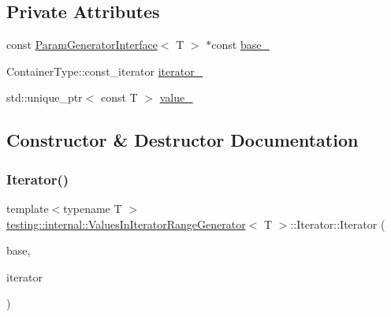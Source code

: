 \subsection*{Private Attributes}
\begin{DoxyCompactItemize}
\item 
const \hyperlink{classtesting_1_1internal_1_1ParamGeneratorInterface}{Param\+Generator\+Interface}$<$ T $>$ $\ast$const \hyperlink{classtesting_1_1internal_1_1ValuesInIteratorRangeGenerator_1_1Iterator_a904df7e46beda1ce5ac2c0ecd6680e0d}{base\+\_\+}
\item 
Container\+Type\+::const\+\_\+iterator \hyperlink{classtesting_1_1internal_1_1ValuesInIteratorRangeGenerator_1_1Iterator_aaff15b9f8addac71b91c32053bf9ea1e}{iterator\+\_\+}
\item 
std\+::unique\+\_\+ptr$<$ const T $>$ \hyperlink{classtesting_1_1internal_1_1ValuesInIteratorRangeGenerator_1_1Iterator_af51f1a21ffb0cd531de7574f4ad1f9b6}{value\+\_\+}
\end{DoxyCompactItemize}


\subsection{Constructor \& Destructor Documentation}
\mbox{\label{classtesting_1_1internal_1_1ValuesInIteratorRangeGenerator_1_1Iterator_aebd635efe7082e6fc45bb8ae0dbefd2e}} 
\subsubsection{\texorpdfstring{Iterator()}{Iterator()}\hspace{0.1cm}{\footnotesize\ttfamily [1/2]}}
{\footnotesize\ttfamily template$<$typename T $>$ \\
\hyperlink{classtesting_1_1internal_1_1ValuesInIteratorRangeGenerator}{testing\+::internal\+::\+Values\+In\+Iterator\+Range\+Generator}$<$ T $>$\+::Iterator\+::\+Iterator (\begin{DoxyParamCaption}\item[{const \hyperlink{classtesting_1_1internal_1_1ParamGeneratorInterface}{Param\+Generator\+Interface}$<$ T $>$ $\ast$}]{base,  }\item[{typename Container\+Type\+::const\+\_\+iterator}]{iterator }\end{DoxyParamCaption})\hspace{0.3cm}{\ttfamily [inline]}}


